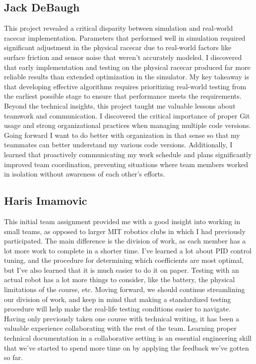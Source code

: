 \documentclass{article}
\begin{document}
\subsection*{Jack DeBaugh}
This project revealed a critical disparity between simulation and real-world racecar implementation. Parameters that performed well in simulation required significant adjustment in the physical racecar due to real-world factors like surface friction and sensor noise that weren't accurately modeled. I discovered that early implementation and testing on the physical racecar produced far more reliable results than extended optimization in the simulator. My key takeaway is that developing effective algorithms requires prioritizing real-world testing from the earliest possible stage to ensure that performance meets the requirements. Beyond the technical insights, this project taught me valuable lessons about teamwork and communication. I discovered the critical importance of proper Git usage and strong organizational practices when managing multiple code versions. Going forward I want to do better with organization in that sense so that my teammates can better understand my various code versions. Additionally, I learned that proactively communicating my work schedule and plans significantly improved team coordination, preventing situations where team members worked in isolation without awareness of each other's efforts.

\subsection*{Haris Imamovic}
This initial team assignment provided me with a good insight into working in small teams, as opposed to larger MIT robotics clubs in which I had previously participated. The main difference is the division of work, as each member has a lot more work to complete in a shorter time. I've learned a lot about PID control tuning, and the procedure for determining which coefficients are most optimal, but I've also learned that it is much easier to do it on paper. Testing with an actual robot has a lot more things to consider, like the battery, the physical limitations of the course, etc. Moving forward, we should continue streamlining our division of work, and keep in mind that making a standardized testing procedure will help make the real-life testing conditions easier to navigate. Having only previously taken one course with technical writing, it has been a valuable experience collaborating with the rest of the team. Learning proper technical documentation in a collaborative setting is an essential engineering skill that we've started to spend more time on by applying the feedback we've gotten so far.
\end{document}

